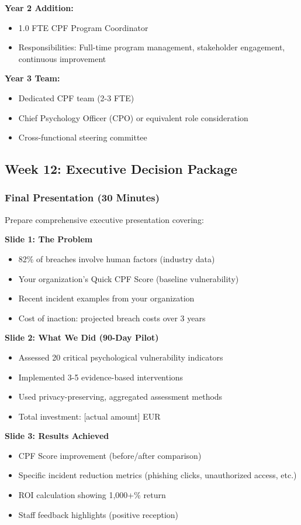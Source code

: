 \documentclass[11pt,a4paper]{article}
\begin{document}
\textbf{Year 2 Addition:}
\begin{itemize}
\item 1.0 FTE CPF Program Coordinator
\item Responsibilities: Full-time program management, stakeholder engagement, continuous improvement
\end{itemize}

\textbf{Year 3 Team:}
\begin{itemize}
\item Dedicated CPF team (2-3 FTE)
\item Chief Psychology Officer (CPO) or equivalent role consideration
\item Cross-functional steering committee
\end{itemize}

\subsection{Week 12: Executive Decision Package}

\subsubsection{Final Presentation (30 Minutes)}

Prepare comprehensive executive presentation covering:

\textbf{Slide 1: The Problem}
\begin{itemize}
\item 82\% of breaches involve human factors (industry data)
\item Your organization's Quick CPF Score (baseline vulnerability)
\item Recent incident examples from your organization
\item Cost of inaction: projected breach costs over 3 years
\end{itemize}

\textbf{Slide 2: What We Did (90-Day Pilot)}
\begin{itemize}
\item Assessed 20 critical psychological vulnerability indicators
\item Implemented 3-5 evidence-based interventions
\item Used privacy-preserving, aggregated assessment methods
\item Total investment: [actual amount] EUR
\end{itemize}

\textbf{Slide 3: Results Achieved}
\begin{itemize}
\item CPF Score improvement (before/after comparison)
\item Specific incident reduction metrics (phishing clicks, unauthorized access, etc.)
\item ROI calculation showing 1,000+\% return
\item Staff feedback highlights (positive reception)
\end{itemize}
\end{document}
